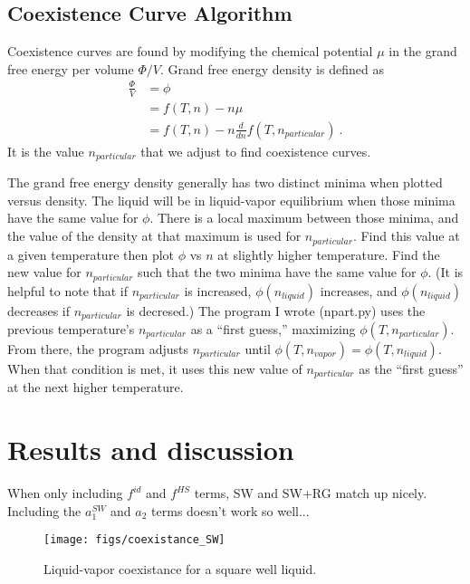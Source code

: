 \documentclass[letterpaper,twocolumn,amsmath,amssymb,prb]{revtex4-1}
\newcommand{\npart}{n_{particular}}
\newcommand{\nliq}{n_{liquid}}
\newcommand{\nvap}{n_{vapor}}
\begin{document}
\subsection{Coexistence Curve Algorithm}
Coexistence curves are found by modifying the chemical potential $\mu$
in the grand free energy per volume $\Phi/V$. Grand free energy
density is defined as
\begin{align}
  \frac{\Phi}{V} &= \phi \nonumber \\
                 &= f(T,n) - n\mu \nonumber \\
                 &= f(T,n) - n\frac{d}{dn}f(T,\npart)\ .
\end{align}
It is the value $\npart$ that we adjust to find coexistence curves.

The grand free energy density generally has two distinct minima when
plotted versus density. The liquid will be in liquid-vapor equilibrium
when those minima have the same value for $\phi$. There is a local
maximum between those minima, and the value of the density at that
maximum is used for $\npart$. Find this value at a given temperature
then plot $\phi$ vs $n$ at slightly higher temperature. Find the new
value for $\npart$ such that the two minima have the same value for
$\phi$. (It is helpful to note that if $\npart$ is increased,
$\phi(\nliq)$ increases, and $\phi(\nliq)$ decreases if $\npart$ is
decresed.) The program I wrote (npart.py) uses the previous
temperature's $\npart$ as a ``first guess,'' maximizing
$\phi(T,\npart)$. From there, the program adjusts $\npart$
until $\phi(T,\nvap) = \phi(T,\nliq)$. When that condition is met, it
uses this new value of $\npart$ as the ``first guess'' at the next
higher temperature.

\section{Results and discussion}

When only including $f^{id}$ and $f^{HS}$ terms, SW and SW+RG match up
nicely. Including the $a_1^{SW}$ and $a_2$ terms doesn't work so
well...

\begin{figure}
  \begin{center}
  \texttt{[image: figs/coexistance\_SW]}
  \end{center}
  \caption{Liquid-vapor coexistance for a square well liquid.}
  \label{fig:coexistance_SW}
\end{figure}
\end{document}
